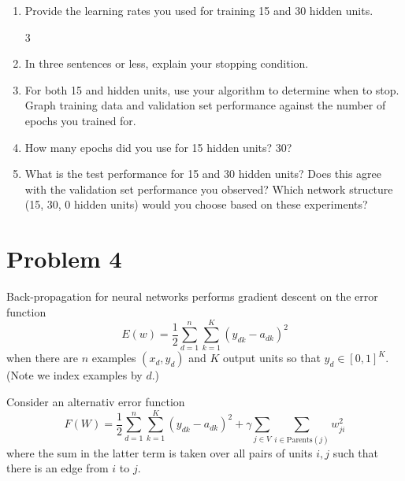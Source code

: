 \documentclass{article}
\begin{document}
\begin{enumerate}
\begin{enumerate}
    \item Provide the learning rates you used for training 15 and 30 hidden units.

      \setcounter{enumii}3

    \item In three sentences or less, explain your stopping condition. 

    \item For both 15 and hidden units, use your algorithm to determine when to stop.
      Graph training data and validation set performance against the number of
      epochs you trained for.

    \item How many epochs did you use for 15 hidden units? 30?

    \item What is the test performance for 15 and 30 hidden units? Does this agree
      with the validation set performance you observed? Which network structure
      (15, 30, 0 hidden units) would you choose based on these experiments?


    \end{enumerate}


  \end{enumerate}

  \section*{Problem 4}
  Back-propagation for neural networks performs gradient descent on the 
  error function
  $$E(w)=\frac{1}{2}\sum_{d=1}^n\sum_{k=1}^K(y_{dk}-a_{dk})^2$$
  when there are $n$ examples $(x_d,y_d)$ and $K$ output units
  so that $y_d\in [0,1]^K$. (Note we index examples by $d$.)

  Consider an alternativ error function
  $$F(W)=\frac{1}{2}\sum_{d=1}^n\sum_{k=1}^K (y_{dk}-a_{dk})^2+\gamma \sum_{j\in V}\sum_{i\in\text{Parents}(j)} w_{ji}^2$$
  where the sum in the latter term is taken over all pairs of units $i,j$
  such that there is an edge from $i$ to $j$. 
\end{document}
